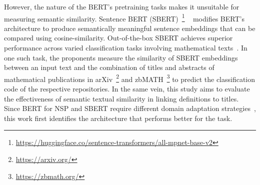 
However, the nature of the BERT's pretraining tasks makes it unsuitable for measuring semantic similarity. Sentence BERT (SBERT)~\footnote{\url{https://huggingface.co/sentence-transformers/all-mpnet-base-v2}} ~\cite{reimers2019sentence} modifies BERT's architecture to produce semantically meaningful sentence embeddings that can be compared using cosine-similarity.
Out-of-the-box SBERT achieves superior performance across varied classification tasks involving mathematical texts~\cite{steinfeldt2024evaluation}. In one such task, the proponents measure the similarity of SBERT embeddings between an input text and the combination of titles and abstracts of mathematical publications in arXiv~\footnote{\url{https://arxiv.org/}} and zbMATH~\footnote{\url{https://zbmath.org/}} to predict the classification code of the respective repositories.
In the same vein, this study aims to evaluate the effectiveness of semantic textual similarity in linking definitions to titles. Since BERT for NSP and SBERT require different domain adaptation strategies~\cite{reimers2019sentence,steinfeldt2024evaluation}, this work first identifies the architecture that performs better for the task.
